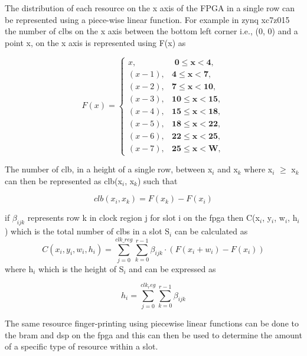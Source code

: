 The distribution of each resource on the x axis of the FPGA in a single row can be represented using a piece-wise linear function. For example in zynq xc7z015 the number of clbs on the x axis between the bottom left corner i.e., (0, 0) and a point x, on the x axis is represented using F(x) as  

\begin{equation}
F(x) = \begin{cases}
x, & \textbf{ 0$\leq$x$<$4}, \\
(x-1), & \textbf{4$\leq$x$<$7}, \\
(x-2), & \textbf{7$\leq$x$<$10}, \\
(x-3), & \textbf{10$\leq$x$<$15}, \\
(x-4), & \textbf{15$\leq$x$<$18}, \\
(x-5), & \textbf{18$\leq$x$<$22}, \\
(x-6), & \textbf{22$\leq$x$<$25}, \\
(x-7), & \textbf{25$\leq$x$<$W},
\end{cases}
\end{equation}

The number of clb, in a height of a single row, between x$_i$ and x$_k$ where x$_i$ $\geq$ x$_k$ can then be represented as clb(x$_i$, x$_k$) such that 

\begin{equation}
clb(x_i, x_k) = F(x_k) - F(x_i)
\end{equation}

if $\beta_{ijk}$ represents row k in clock region j for slot i on the fpga then C(x$_i$, y$_i$, w$_i$, h$_i$) which is the total number of clbs in a slot S$_i$ can be calculated as 
\begin{equation}
C(x_i,y_i,w_i,h_i) = \sum_{j=0}^{clk\_reg} \sum_{k=0}^{r-1} \beta_{ijk} \cdot (F(x_i+w_i) - F(x_i))
\label{clb_tot}
\end{equation}
where h$_i$ which is the height of S$_i$ and can be expressed as 

\begin{equation}
h_i = \sum_{j=0} ^{clk_reg} \sum_{k=0}^{r-1} \beta_{ijk}
\end{equation}

The same resource finger-printing using piecewise linear functions can be done to the bram and dsp on the fpga and this can then be used to determine the amount of a specific type of resource within a slot.
